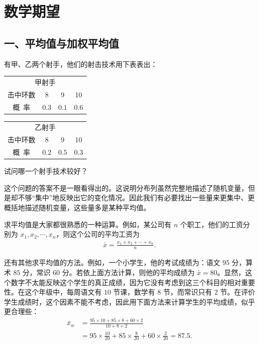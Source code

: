 \documentclass[../../main.tex]{subfiles}
\begin{document}
\section{数学期望}\label{section:ch04-数学期望}

\subsection*{一、平均值与加权平均值}

有甲、乙两个射手，他们的射击技术用下表表出：

\begin{center}
\begin{tabular}{c|ccc}
\multicolumn{4}{c}{甲射手}\\
击中环数 & 8 & 9 & 10\\
\hline
概\ 率 & $0.3$ & $0.1$ & $0.6$
\end{tabular}
\qquad
\begin{tabular}{c|ccc}
\multicolumn{4}{c}{乙射手}\\
击中环数 & 8 & 9 & 10\\
\hline
概\ 率 & $0.2$ & $0.5$ & $0.3$
\end{tabular}
\end{center}

试问哪一个射手技术较好？

这个问题的答案不是一眼看得出的。这说明分布列虽然完整地描述了随机变量，但是却不够``集中''地反映出它的变化情况。因此我们有必要找出一些量来更集中、更概括地描述随机变量，这些量多是某种平均值。

求平均值是大家都很熟悉的一种运算。例如，某公司有 $n$ 个职工，他们的工资分别为 $x_1,x_2,\cdots,x_n$，则这个公司的平均工资为
\begin{align}
\bar{x}=\frac{x_1+x_2+\cdots+x_n}{n}.\label{align:ch04-算术平均}
\end{align}

还有其他求平均值的方法。例如，一个小学生，他的考试成绩为：语文 $95$ 分，算术 $85$ 分，常识 $60$ 分。若依上面方法计算，则他的平均成绩为 $\bar{x}=80$。显然，这个数字不太能反映这个学生的真正成绩，因为它没有考虑到这三个科目的相对重要性。在这个年级中，每周语文有 $10$ 节课，数学有 $8$ 节，而常识只有 $2$ 节。在评价学生成绩时，这个因素不能不考虑，因此用下面方法来计算学生的平均成绩，似乎更合理些：
\begin{align*}
\bar{x}_w&=\frac{95\times 10+85\times 8+60\times 2}{10+8+2}\\
&=95\times\frac{10}{20}+85\times\frac{8}{20}+60\times\frac{2}{20}=87.5.
\end{align*}
\end{document}
